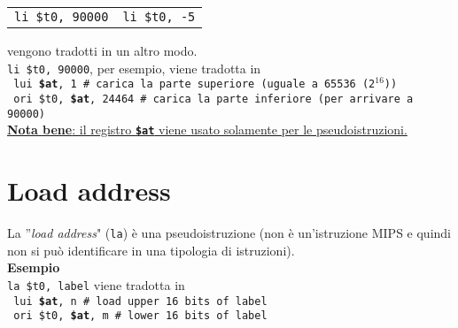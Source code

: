 \documentclass[../main.tex]{subfiles}
\begin{document}
\begin{center}
    \setlength{\tabcolsep}{30pt}
    \begin{tabular}{ c | c }
        \texttt{li \$t0, 90000} & \texttt{li \$t0, -5} \\
    \end{tabular}
\end{center}

\noindent
vengono tradotti in un altro modo. \\
\texttt{li \$t0, 90000}, per esempio, viene tradotta in \\
\texttt{\hspace*{0cm} \hspace*{0cm} \hspace*{0cm} lui \textbf{\$at}, 1 \# carica la parte superiore (uguale a 65536 (2$^\text{16}$))} \\
\texttt{\hspace*{0cm} \hspace*{0cm} \hspace*{0cm} ori \$t0, \textbf{\$at}, 24464 \# carica la parte inferiore (per arrivare a 90000)}
\\[1mm]
\underline{\textbf{Nota bene}: il registro \texttt{\textbf{\$at}} viene usato solamente per le pseudoistruzioni.}

\section{Load address}
La ''\textit{load address}" (\texttt{la}) è una pseudoistruzione
(non è un'istruzione MIPS e quindi non si può identificare in una
tipologia di istruzioni).
\\[2mm]
\textbf{Esempio} \\
\texttt{la \$t0, label} viene tradotta in \\
\texttt{\hspace*{0cm} \hspace*{0cm} \hspace*{0cm} lui \textbf{\$at}, n \# load upper 16 bits of label} \\
\texttt{\hspace*{0cm} \hspace*{0cm} \hspace*{0cm} ori \$t0, \textbf{\$at}, m \# lower 16 bits of label}
\end{document}
